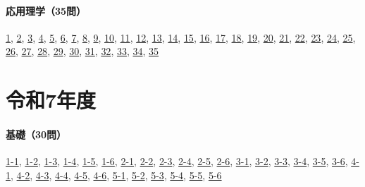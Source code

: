\paragraph{応用理学（35問）} \hyperref[q:r06-reg-applied-01]{1}, \hyperref[q:r06-reg-applied-02]{2}, \hyperref[q:r06-reg-applied-03]{3}, \hyperref[q:r06-reg-applied-04]{4}, \hyperref[q:r06-reg-applied-05]{5}, \hyperref[q:r06-reg-applied-06]{6}, \hyperref[q:r06-reg-applied-07]{7}, \hyperref[q:r06-reg-applied-08]{8}, \hyperref[q:r06-reg-applied-09]{9}, \hyperref[q:r06-reg-applied-10]{10}, \hyperref[q:r06-reg-applied-11]{11}, \hyperref[q:r06-reg-applied-12]{12}, \hyperref[q:r06-reg-applied-13]{13}, \hyperref[q:r06-reg-applied-14]{14}, \hyperref[q:r06-reg-applied-15]{15}, \hyperref[q:r06-reg-applied-16]{16}, \hyperref[q:r06-reg-applied-17]{17}, \hyperref[q:r06-reg-applied-18]{18}, \hyperref[q:r06-reg-applied-19]{19}, \hyperref[q:r06-reg-applied-20]{20}, \hyperref[q:r06-reg-applied-21]{21}, \hyperref[q:r06-reg-applied-22]{22}, \hyperref[q:r06-reg-applied-23]{23}, \hyperref[q:r06-reg-applied-24]{24}, \hyperref[q:r06-reg-applied-25]{25}, \hyperref[q:r06-reg-applied-26]{26}, \hyperref[q:r06-reg-applied-27]{27}, \hyperref[q:r06-reg-applied-28]{28}, \hyperref[q:r06-reg-applied-29]{29}, \hyperref[q:r06-reg-applied-30]{30}, \hyperref[q:r06-reg-applied-31]{31}, \hyperref[q:r06-reg-applied-32]{32}, \hyperref[q:r06-reg-applied-33]{33}, \hyperref[q:r06-reg-applied-34]{34}, \hyperref[q:r06-reg-applied-35]{35}
\section{令和7年度}
\paragraph{基礎（30問）} \hyperref[q:r07-reg-basic-1-1]{1-1}, \hyperref[q:r07-reg-basic-1-2]{1-2}, \hyperref[q:r07-reg-basic-1-3]{1-3}, \hyperref[q:r07-reg-basic-1-4]{1-4}, \hyperref[q:r07-reg-basic-1-5]{1-5}, \hyperref[q:r07-reg-basic-1-6]{1-6}, \hyperref[q:r07-reg-basic-2-1]{2-1}, \hyperref[q:r07-reg-basic-2-2]{2-2}, \hyperref[q:r07-reg-basic-2-3]{2-3}, \hyperref[q:r07-reg-basic-2-4]{2-4}, \hyperref[q:r07-reg-basic-2-5]{2-5}, \hyperref[q:r07-reg-basic-2-6]{2-6}, \hyperref[q:r07-reg-basic-3-1]{3-1}, \hyperref[q:r07-reg-basic-3-2]{3-2}, \hyperref[q:r07-reg-basic-3-3]{3-3}, \hyperref[q:r07-reg-basic-3-4]{3-4}, \hyperref[q:r07-reg-basic-3-5]{3-5}, \hyperref[q:r07-reg-basic-3-6]{3-6}, \hyperref[q:r07-reg-basic-4-1]{4-1}, \hyperref[q:r07-reg-basic-4-2]{4-2}, \hyperref[q:r07-reg-basic-4-3]{4-3}, \hyperref[q:r07-reg-basic-4-4]{4-4}, \hyperref[q:r07-reg-basic-4-5]{4-5}, \hyperref[q:r07-reg-basic-4-6]{4-6}, \hyperref[q:r07-reg-basic-5-1]{5-1}, \hyperref[q:r07-reg-basic-5-2]{5-2}, \hyperref[q:r07-reg-basic-5-3]{5-3}, \hyperref[q:r07-reg-basic-5-4]{5-4}, \hyperref[q:r07-reg-basic-5-5]{5-5}, \hyperref[q:r07-reg-basic-5-6]{5-6}
